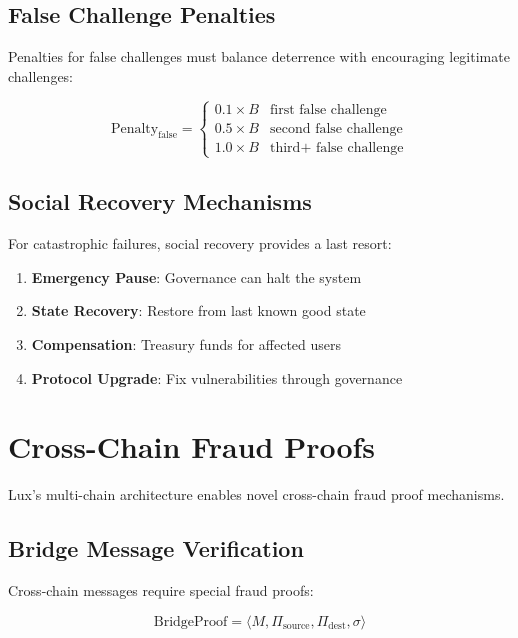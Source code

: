 \documentclass[11pt,a4paper]{article}
\theoremstyle{definition}
\begin{document}
\subsection{False Challenge Penalties}

Penalties for false challenges must balance deterrence with encouraging legitimate challenges:

\begin{equation}
\text{Penalty}_{\text{false}} = \begin{cases}
0.1 \times B & \text{first false challenge} \\
0.5 \times B & \text{second false challenge} \\
1.0 \times B & \text{third+ false challenge}
\end{cases}
\end{equation}

\subsection{Social Recovery Mechanisms}

For catastrophic failures, social recovery provides a last resort:

\begin{enumerate}
    \item \textbf{Emergency Pause}: Governance can halt the system
    \item \textbf{State Recovery}: Restore from last known good state
    \item \textbf{Compensation}: Treasury funds for affected users
    \item \textbf{Protocol Upgrade}: Fix vulnerabilities through governance
\end{enumerate}

\section{Cross-Chain Fraud Proofs}

Lux's multi-chain architecture enables novel cross-chain fraud proof mechanisms.

\subsection{Bridge Message Verification}

Cross-chain messages require special fraud proofs:

\begin{equation}
\text{BridgeProof} = \langle M, \Pi_{\text{source}}, \Pi_{\text{dest}}, \sigma \rangle
\end{equation}
\end{document}
